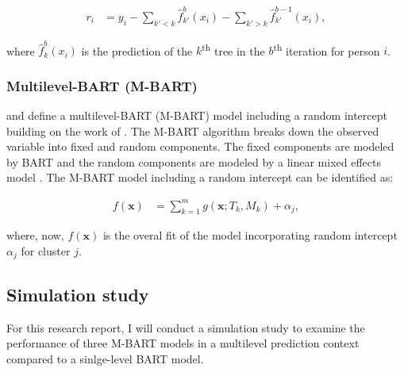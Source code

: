 \documentclass[10pt, a4paper, titlepage]{article}
\begin{document}
\begin{subequations}
\label{eq:partialresiduals}
\begin{align}
r_i &= y_i - \sum_{k' < k} \hat{f}^{b}_{k'}(x_{i}) - \sum_{k' > k} \hat{f}^{b-1}_{k'}(x_{i}), \tag{2}
\end{align}
\end{subequations}

where $\hat{f}^{b}_{k}(x_{i})$ is the prediction of the $k$\textsuperscript{th} tree in the $b$\textsuperscript{th} iteration for person $i$.

\subsubsection{Multilevel-BART (M-BART)}
\citet{chen2020, wagner2020} and \citet{tan2016} define a multilevel-BART (M-BART) model including a random intercept building on the work of \citet{lin2019}. The M-BART algorithm breaks down the observed variable into fixed and random components. The fixed components are modeled by BART and the random components are modeled by a linear mixed effects model \citep{chen2020, wagner2020, tan2016}.
The M-BART model including a random intercept can be identified as:

\begin{subequations}
\label{eq:M-BART}
\begin{align}
f(\textbf{x}) &= \sum^{m}_{k=1}g(\textbf{x}; T_{k}, M_{k}) + \alpha_{j}, \tag{3}
\end{align}
\end{subequations}

where, now, $f(\textbf{x})$ is the overal fit of the model incorporating random intercept $\alpha_{j}$ for cluster $j$.

\subsection{Simulation study}
For this research report, I will conduct a simulation study to examine the performance of three M-BART models in a multilevel prediction context compared to a sinlge-level BART model.
\end{document}

